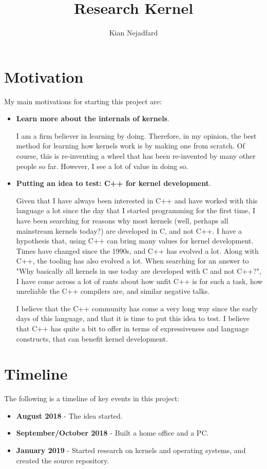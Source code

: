\documentclass[a4paper,12pt,twoside]{book}
\title{Research Kernel}
\author{Kian Nejadfard}
\begin{document}
    \maketitle
    
    \section*{Motivation}
        My main motivations for starting this project are:
        \begin{itemize}
            \item \textbf{Learn more about the internals of kernels}.
            
            I am a firm believer in learning by doing. Therefore, in my opinion, the best method for learning how kernels work is by making one from scratch. Of course, this is re-inventing a wheel that has been re-invented by many other people so far. However, I see a lot of value in doing so.
            \item \textbf{Putting an idea to test: C++ for kernel development}.
            
            Given that I have always been interested in C++ and have worked with this language a lot since the day that I started programming for the first time, I have been searching for reasons why most kernels (well, perhaps all mainstream kernels today?) are developed in C, and not C++. I have a hypothesis that, using C++ can bring many values for kernel development. Times have changed since the 1990s, and C++ has evolved a lot. Along with C++, the tooling has also evolved a lot. When searching for an answer to "Why basically all kernels in use today are developed with C and not C++?", I have come across a lot of rants about how unfit C++ is for such a task, how unreliable the C++ compilers are, and similar negative talks.
            
            I believe that the C++ community has come a very long way since the early days of this language, and that it is time to put this idea to test. I believe that C++ has quite a bit to offer in terms of expressiveness and language constructs, that can benefit kernel development. 
        \end{itemize}

    \section*{Timeline}
        The following is a timeline of key events in this project:
        \begin{itemize}
            \item \textbf{August 2018} - The idea started.
            \item \textbf{September/October 2018} - Built a home office and a PC.
            \item \textbf{January 2019} - Started research on kernels and operating systems, and created the source repository.
        \end{itemize}
    
\end{document}
